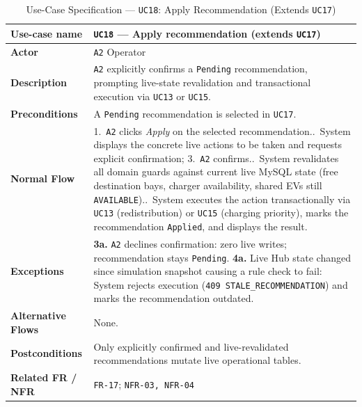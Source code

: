\begin{table}[H]
  \centering
  \singlespacing\footnotesize
  \caption{Use-Case Specification --- \texttt{UC18}: Apply Recommendation (Extends \texttt{UC17})}
  \label{tab:uc18}
  \renewcommand{\arraystretch}{1.13}
  \begin{tabularx}{\textwidth}{|L{2.9cm}|Y|}
    \hline
    \textbf{Use-case name} & \textbf{\texttt{UC18} --- Apply recommendation (extends \texttt{UC17})} \\
    \hline
    \textbf{Actor} & \texttt{A2} Operator \\
    \hline
    \textbf{Description} & \texttt{A2} explicitly confirms a \texttt{Pending} recommendation, prompting live-state revalidation and transactional execution via \texttt{UC13} or \texttt{UC15}. \\
    \hline
    \textbf{Preconditions} & A \texttt{Pending} recommendation is selected in \texttt{UC17}. \\
    \hline
    \textbf{Normal Flow} & 1.\ \texttt{A2} clicks \textit{Apply} on the selected recommendation..\ System displays the concrete live actions to be taken and requests explicit confirmation; 3.\ \texttt{A2} confirms..\ System revalidates all domain guards against current live MySQL state (free destination bays, charger availability, shared EVs still \texttt{AVAILABLE})..\ System executes the action transactionally via \texttt{UC13} (redistribution) or \texttt{UC15} (charging priority), marks the recommendation \texttt{Applied}, and displays the result. \\
    \hline
    \textbf{Exceptions} & \textbf{3a.} \texttt{A2} declines confirmation: zero live writes; recommendation stays \texttt{Pending}.\newline
    \textbf{4a.} Live Hub state changed since simulation snapshot causing a rule check to fail: System rejects execution (\texttt{409 STALE\_\allowbreak RECOMMENDATION}) and marks the recommendation outdated. \\
    \hline
    \textbf{Alternative Flows} & None. \\
    \hline
    \textbf{Postconditions} & Only explicitly confirmed and live-revalidated recommendations mutate live operational tables. \\
    \hline
    \textbf{Related FR / NFR} & \texttt{FR-17}; \texttt{NFR-03, NFR-04} \\
    \hline
  \end{tabularx}
\end{table}
